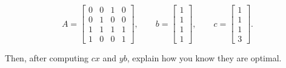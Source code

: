 \[A=\begin{bmatrix}0&0&1&0\\ 0&1&0&0\\ 1&1&1&1\\ 1&0&0&1\end{bmatrix},\qquad b=\begin{bmatrix}1\\ 1\\ 1\\ 1\end{bmatrix},\qquad c=\begin{bmatrix}1\\ 1\\ 1\\ 3\end{bmatrix}.\]

Then, after computing \(cx\) and \(yb\), explain how you know they are optimal.

 